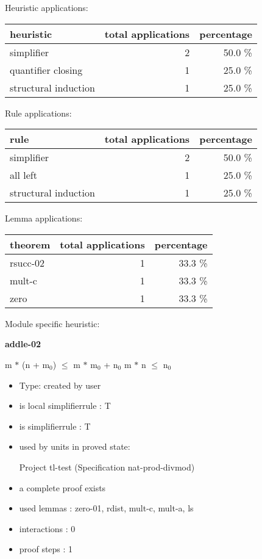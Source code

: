 \documentclass[a4paper]{article}
\begin{document}
\medskip


Heuristic applications:

\begin{supertabular}{l|r|r}
heuristic	& total applications & percentage \\ \hline
simplifier & 2 & 50.0 \% \\
quantifier closing & 1 & 25.0 \% \\
structural induction & 1 & 25.0 \% \\

\end{supertabular}

Rule applications:

\begin{supertabular}{l|r|r}
rule	        & total applications & percentage \\ \hline
simplifier & 2 & 50.0 \% \\
all left & 1 & 25.0 \% \\
structural induction & 1 & 25.0 \% \\

\end{supertabular}

Lemma applications:

\begin{supertabular}{l|r|r}
theorem	        & total applications & percentage \\ \hline
rsucc-02 & 1 & 33.3 \% \\
mult-c & 1 & 33.3 \% \\
zero & 1 & 33.3 \% \\

\end{supertabular}

Module specific heuristic:

\pagebreak

{\LARGE\bf addle-02}\label{lemma-addle-02}

\medskip

 \Fol m $*$ (n + $\mbox{m}_{0}$) $\le$ m $*$ $\mbox{m}_{0}$ + $\mbox{n}_{0}$ \Equiv m $*$ n $\le$ $\mbox{n}_{0}$

\begin{itemize}

\item Type: created by user

\item is local simplifierrule : T
\item is simplifierrule : T
\item used by units in proved state:

Project tl-test (Specification nat-prod-divmod)
\item       a complete proof exists
\item       used lemmas  : zero-01, rdist, mult-c, mult-a, ls
\item       interactions : 0
\item       proof steps  : 1
\end{itemize}
\end{document}
